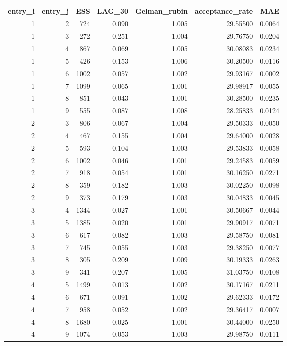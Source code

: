 \begin{longtable}{rrrrrrr}
\toprule
entry\_i & entry\_j & ESS & LAG\_30 & Gelman\_rubin & acceptance\_rate & MAE \\ 
\midrule
1 & 2 & 724 & 0.090 & 1.005 & 29.55500 & 0.0064 \\ 
1 & 3 & 272 & 0.251 & 1.004 & 29.76750 & 0.0204 \\ 
1 & 4 & 867 & 0.069 & 1.005 & 30.08083 & 0.0234 \\ 
1 & 5 & 426 & 0.153 & 1.006 & 30.20500 & 0.0116 \\ 
1 & 6 & 1002 & 0.057 & 1.002 & 29.93167 & 0.0002 \\ 
1 & 7 & 1099 & 0.065 & 1.001 & 29.98917 & 0.0055 \\ 
1 & 8 & 851 & 0.043 & 1.001 & 30.28500 & 0.0235 \\ 
1 & 9 & 555 & 0.087 & 1.008 & 28.25833 & 0.0124 \\ 
2 & 3 & 806 & 0.067 & 1.004 & 29.50333 & 0.0050 \\ 
2 & 4 & 467 & 0.155 & 1.004 & 29.64000 & 0.0028 \\ 
2 & 5 & 593 & 0.104 & 1.003 & 29.53833 & 0.0058 \\ 
2 & 6 & 1002 & 0.046 & 1.001 & 29.24583 & 0.0059 \\ 
2 & 7 & 918 & 0.054 & 1.001 & 30.16250 & 0.0271 \\ 
2 & 8 & 359 & 0.182 & 1.003 & 30.02250 & 0.0098 \\ 
2 & 9 & 373 & 0.179 & 1.003 & 30.04833 & 0.0045 \\ 
3 & 4 & 1344 & 0.027 & 1.001 & 30.50667 & 0.0044 \\ 
3 & 5 & 1385 & 0.020 & 1.001 & 29.90917 & 0.0071 \\ 
3 & 6 & 617 & 0.082 & 1.003 & 29.58750 & 0.0081 \\ 
3 & 7 & 745 & 0.055 & 1.003 & 29.38250 & 0.0077 \\ 
3 & 8 & 305 & 0.209 & 1.009 & 30.19333 & 0.0263 \\ 
3 & 9 & 341 & 0.207 & 1.005 & 31.03750 & 0.0108 \\ 
4 & 5 & 1499 & 0.013 & 1.002 & 30.17167 & 0.0211 \\ 
4 & 6 & 671 & 0.091 & 1.002 & 29.62333 & 0.0172 \\ 
4 & 7 & 958 & 0.052 & 1.002 & 29.36417 & 0.0007 \\ 
4 & 8 & 1680 & 0.025 & 1.001 & 30.44000 & 0.0250 \\ 
4 & 9 & 1074 & 0.053 & 1.003 & 29.98750 & 0.0111 \\ 

\end{longtable}
